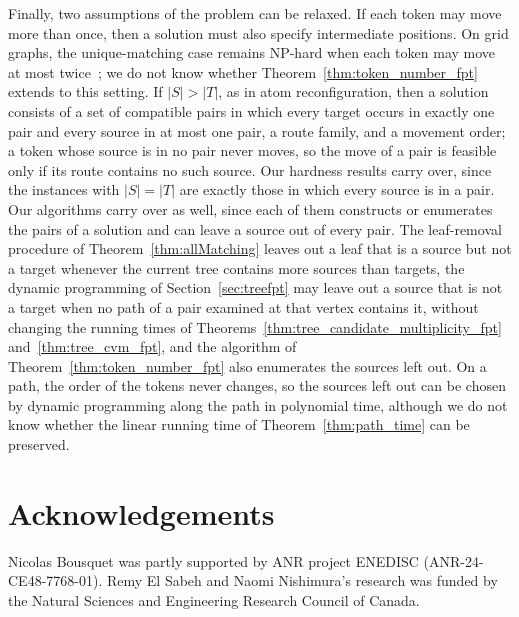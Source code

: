 \documentclass[a4paper,USenglish,thm-restate]{lipics-v2021}
\theoremstyle{problemstyle}
\begin{document}
Finally, two assumptions of the problem can be relaxed. If each token may
move more than once, then a solution must also specify intermediate
positions. On grid graphs, the unique-matching case remains
\textsf{NP}-hard when each token may move at most
twice~\cite{VanDerHorst2026Squares}; we do not know whether
Theorem~\ref{thm:token_number_fpt} extends to this setting. If
$|S| > |T|$, as in atom reconfiguration, then a solution consists of a set of compatible pairs in
which every target occurs in exactly one pair and every source in at most
one pair, a route family, and a movement order; a token whose source is in
no pair never moves, so the move of a pair is feasible only if its route
contains no such source. Our hardness results carry over, since the
instances with $|S| = |T|$ are exactly those in which every source is in a
pair. Our algorithms carry over as well, since each of them constructs or
enumerates the pairs of a solution and can leave a source out of every
pair. The leaf-removal procedure of Theorem~\ref{thm:allMatching} leaves
out a leaf that is a source but not a target whenever the current tree
contains more sources than targets, the dynamic programming of
Section~\ref{sec:treefpt} may leave out a source that is not a target when
no path of a pair examined at that vertex contains it, without changing
the running times of Theorems~\ref{thm:tree_candidate_multiplicity_fpt}
and~\ref{thm:tree_cvm_fpt}, and the algorithm of
Theorem~\ref{thm:token_number_fpt} also enumerates the sources left out.
On a path, the order of the tokens never changes, so the sources left out
can be chosen by dynamic programming along the path in polynomial time,
although we do not know whether the linear running time of
Theorem~\ref{thm:path_time} can be preserved.

\section*{Acknowledgements}
Nicolas Bousquet was partly supported by ANR project ENEDISC
(ANR-24-CE48-7768-01). Remy El Sabeh and Naomi Nishimura's research was
funded by the Natural Sciences and Engineering Research Council of Canada.




\end{document}
